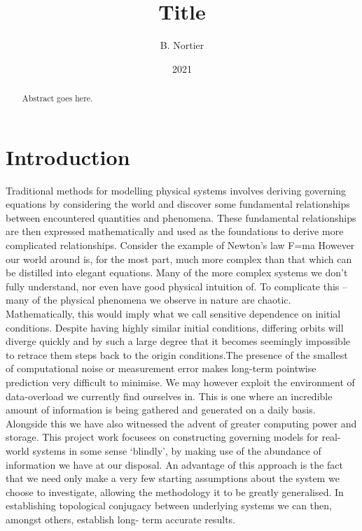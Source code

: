 \documentclass[12pt, oneside]{article}
\theoremstyle{definition}
\begin{document}
\title{Title}


\author{B. Nortier\\
}
\date{2021}
\date{}
\maketitle

\begin{abstract}
Abstract goes here.
\end{abstract}




\section{Introduction}
Traditional methods for modelling physical systems involves deriving governing equations by
considering the world and discover some fundamental relationships between encountered
quantities and phenomena. These fundamental relationships are then expressed mathematically and
used as the foundations to derive more complicated relationships. Consider the example of
Newton’s law F=ma
However our world around is, for the most part, much more complex than that which can be
distilled into elegant equations. Many of the more complex systems we don’t fully understand, nor
even have good physical intuition of.
To complicate this – many of the physical phenomena we observe in nature are chaotic.
Mathematically, this would imply what we call sensitive dependence on initial conditions. Despite
having highly similar initial conditions, differing orbits will diverge quickly and by such a large degree
that it becomes seemingly impossible to retrace them steps back to the origin conditions.The
presence of the smallest of computational noise or measurement error makes long-term pointwise
prediction very difficult to minimise.
We may however exploit the environment of data-overload we currently find ourselves in. This is
one where an incredible amount of information is being gathered and generated on a daily basis.
Alongside this we have also witnessed the advent of greater computing power and storage.
This project work focusees on constructing governing models for real-world systems in some sense
‘blindly’, by making use of the abundance of information we have at our disposal. An advantage of
this approach is the fact that we need only make a very few starting assumptions about the system
we choose to investigate, allowing the methodology it to be greatly generalised. In establishing 
topological conjugacy between underlying systems we can then, amongst others, establish long-
term accurate results.
\end{document}
